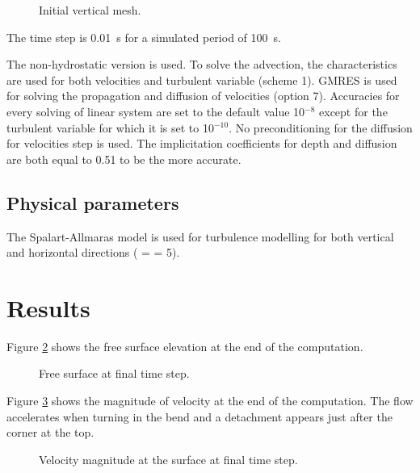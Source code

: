 \begin{figure}[!htbp]
 \centering
 \caption{Initial vertical mesh.}
 \label{t3d:bendrans:fig:meshV}
\end{figure}

The time step is 0.01~s for a simulated period of 100~s.

The non-hydrostatic version is used.
To solve the advection, the characteristics
are used for both velocities and turbulent variable (scheme 1).
GMRES is used for solving the propagation and diffusion of velocities (option 7).
Accuracies for every solving of linear system are set to the default value 10$^{-8}$
except for the turbulent variable for which it is set to 10$^{-10}$.
No preconditioning for the diffusion for velocities step is used.
The implicitation coefficients for depth and diffusion are both equal to 0.51
to be the more accurate.

\subsection{Physical parameters}

The Spalart-Allmaras model is used for turbulence modelling for both vertical
and horizontal directions
( =  = 5).

\section{Results}

Figure \ref{t3d:bendrans:FreeSurf} shows the free surface elevation at the end of
the computation.

\begin{figure}[H]
  \centering
  \caption{Free surface at final time step.}
  \label{t3d:bendrans:FreeSurf}
\end{figure}

Figure \ref{t3d:bendrans:Velo} shows the magnitude of velocity at the end of the
computation.
The flow accelerates when turning in the bend and a detachment appears
just after the corner at the top.

\begin{figure}[H]
  \centering
  \caption{Velocity magnitude at the surface at final time step.}
  \label{t3d:bendrans:Velo}
\end{figure}

